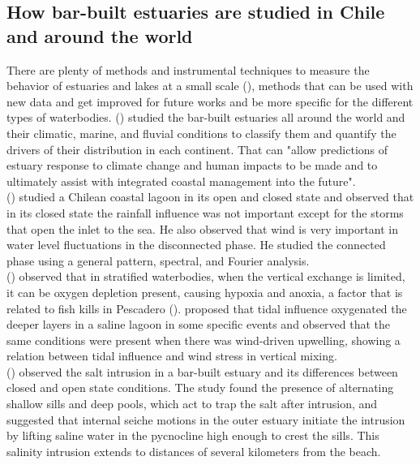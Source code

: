 \documentclass[tesis.tex]{subfiles}
\begin{document}
\subsection{How bar-built estuaries are studied in Chile and around the world}

There are plenty of methods and instrumental techniques to measure the behavior of estuaries and lakes at a small scale (\cite{Wuest2003}), methods that can be used with new data and get improved for future works and be more specific for the different types of waterbodies. \citeauthor{mcsweeney2017intermittently} (\cite*{mcsweeney2017intermittently}) studied the bar-built estuaries all around the world and their climatic, marine, and fluvial conditions to classify them and quantify the drivers of their distribution in each continent. That can "allow predictions of estuary response to climate change and human impacts to be made and to ultimately assist with integrated coastal management into the future".\\

\citeauthor{dussaillant2009} (\cite*{dussaillant2009}) studied a Chilean coastal lagoon in its open and closed state and observed that in its closed state the rainfall influence was not important except for the storms that open the inlet to the sea. He also observed that wind is very important in water level fluctuations in the disconnected phase. He studied the connected phase using a general pattern, spectral, and Fourier analysis.\\

\citeauthor{Kelly2018} (\cite*{Kelly2018}) observed that in stratified waterbodies, when the vertical exchange is limited, it can be oxygen depletion present, causing hypoxia and anoxia, a factor that is related to fish kills in Pescadero (\cite{largier2015}). \citeauthor{Kelly2018} proposed that tidal influence oxygenated the deeper layers in a saline lagoon in some specific events and observed that the same conditions were present when there was wind-driven upwelling, showing a relation between tidal influence and wind stress in vertical mixing.\\

\citeauthor{Behrens2016} (\cite*{Behrens2016}) observed the salt intrusion in a bar-built estuary and its differences between closed and open state conditions. The study found the presence of alternating shallow sills and deep pools, which act to trap the salt after intrusion, and suggested that internal seiche motions in the outer estuary initiate the intrusion by lifting saline water in the pycnocline high enough to crest the sills. This salinity intrusion extends to distances of several kilometers from the beach.\\
\end{document}
